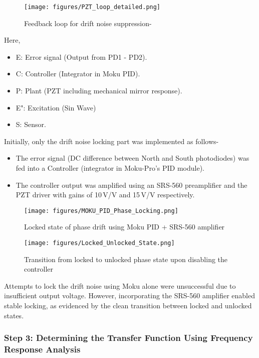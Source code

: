 \documentclass[colorlinks=true,pdfstartview=FitV,linkcolor=blue,
citecolor=red,urlcolor=magenta]{ligodoc}
\begin{document}
\begin{figure}[H]
    \centering
    \texttt{[image: figures/PZT\_loop\_detailed.png]}
    \label{TF}
    \caption{Feedback loop for drift noise suppression- }
\end{figure}
Here,
\begin{itemize}
 \item E: Error signal (Output from PD1 - PD2).

\item C: Controller (Integrator in Moku PID).

\item P: Plant (PZT including mechanical mirror response).
\item E": Excitation (Sin Wave)
\item S: Sensor.
\end{itemize}

Initially, only the drift noise locking part was implemented as follows-
\begin{itemize}
    \item The error signal (DC difference between North and South photodiodes) was fed into a Controller (integrator in Moku-Pro's PID module).
    \item The controller output was amplified using an SRS-560 preamplifier and the PZT driver with gains of 10\,V/V and 15\,V/V respectively.
\end{itemize}

\begin{figure}[H]
    \centering
    \texttt{[image: figures/MOKU\_PID\_Phase\_Locking.png]}
    \caption{Locked state of phase drift using Moku PID + SRS-560 amplifier}
\end{figure}

\begin{figure}[H]
    \centering
    \texttt{[image: figures/Locked\_Unlocked\_State.png]}
    \caption{Transition from locked to unlocked phase state upon disabling the controller}
\end{figure}

Attempts to lock the drift noise using Moku alone were unsuccessful due to insufficient output voltage. However, incorporating the SRS-560 amplifier enabled stable locking, as evidenced by the clean transition between locked and unlocked states.

\subsubsection*{Step 3: Determining the Transfer Function Using Frequency Response Analysis}
\end{document}
